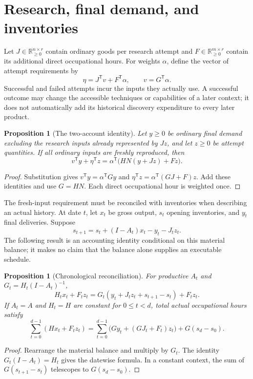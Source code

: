 \documentclass[11pt,a4paper]{article}
\newtheorem{proposition}[theorem]{Proposition}
\begin{document}
\section{Research, final demand, and inventories}
Let $J\in\mathbb R_{\geq0}^{n\times r}$ contain ordinary goods per research attempt and $F\in\mathbb R_{\geq0}^{m\times r}$ contain its additional direct occupational hours. For weights $\alpha$, define the vector of attempt requirements by
\begin{equation}
\eta=J^{\mathsf T}v+F^{\mathsf T}\alpha,
\qquad v=G^{\mathsf T}\alpha.
\end{equation}
Successful and failed attempts incur the inputs they actually use. A successful outcome may change the accessible techniques or capabilities of a later context; it does not automatically add its historical discovery expenditure to every later product.

\begin{proposition}[The two-account identity]
Let $y\geq0$ be ordinary final demand excluding the research inputs already represented by $Jz$, and let $z\geq0$ be attempt quantities. If all ordinary inputs are freshly reproduced, then
\begin{equation}
v^{\mathsf T}y+\eta^{\mathsf T}z
=\alpha^{\mathsf T}\bigl(HN(y+Jz)+Fz\bigr).
\end{equation}
\end{proposition}
\begin{proof}
Substitution gives $v^{\mathsf T}y=\alpha^{\mathsf T}Gy$ and $\eta^{\mathsf T}z=\alpha^{\mathsf T}(GJ+F)z$. Add these identities and use $G=HN$. Each direct occupational hour is weighted once.
\end{proof}

The fresh-input requirement must be reconciled with inventories when describing an actual history. At date $t$, let $x_t$ be gross output, $s_t$ opening inventories, and $y_t$ final deliveries. Suppose
\begin{equation}
s_{t+1}=s_t+(I-A_t)x_t-y_t-J_tz_t.
\end{equation}
The following result is an accounting identity conditional on this material balance; it makes no claim that the balance alone supplies an executable schedule.

\begin{proposition}[Chronological reconciliation]
For productive $A_t$ and $G_t=H_t(I-A_t)^{-1}$,
\begin{equation}
H_tx_t+F_tz_t
=G_t(y_t+J_tz_t+s_{t+1}-s_t)+F_tz_t.
\end{equation}
If $A_t=A$ and $H_t=H$ are constant for $0\leq t<d$, total actual occupational hours satisfy
\begin{equation}
\sum_{t=0}^{d-1}(Hx_t+F_tz_t)
=\sum_{t=0}^{d-1}\bigl(Gy_t+(GJ_t+F_t)z_t\bigr)+G(s_d-s_0).
\end{equation}
\end{proposition}
\begin{proof}
Rearrange the material balance and multiply by $G_t$. The identity $G_t(I-A_t)=H_t$ gives the datewise formula. In a constant context, the sum of $G(s_{t+1}-s_t)$ telescopes to $G(s_d-s_0)$.
\end{proof}
\end{document}
